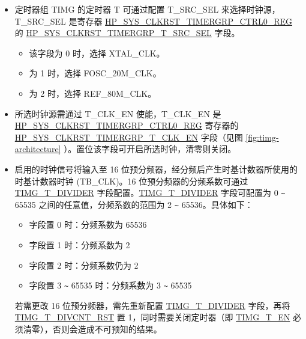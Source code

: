 \documentclass[main\_\_CN.tex]{subfiles}
\begin{document}
\begin{itemize}
    \item 定时器组 TIMG 的定时器 T 可通过配置 T\_SRC\_SEL 来选择时钟源，T\_SRC\_SEL 是寄存器 \hyperref[regdesc:HPSYSCLKRSTTIMERGRPNCTRL0REG]{HP\_SYS\_CLKRST\_TIMERGRP\_CTRL0\_REG} 的 \hyperref[fielddesc:HPSYSCLKRSTTIMERGRPNTXSRCSEL]{HP\_SYS\_CLKRST\_TIMERGRP\_T\_SRC\_SEL} 字段。
    \begin{itemize}
        \item 该字段为 0 时，选择 XTAL\_CLK。
        \item 为 1 时，选择 FOSC\_20M\_CLK。
        \item 为 2 时，选择 REF\_80M\_CLK。
    \end{itemize}

    \item 所选时钟源需通过 T\_CLK\_EN 使能，T\_CLK\_EN 是 \hyperref[regdesc:HPSYSCLKRSTTIMERGRPNCTRL0REG]{HP\_SYS\_CLKRST\_TIMERGRP\_CTRL0\_REG} 寄存器的 \hyperref[fielddesc:HPSYSCLKRSTTIMERGRPNTXCLKEN]{HP\_SYS\_CLKRST\_TIMERGRP\_T\_CLK\_EN} 字段（见图 \ref{fig:timg-architecture} \textit{}）。置位该字段可开启所选时钟，清零则关闭。
    \item 启用的时钟信号将输入至 16 位预分频器，经分频后产生时基计数器所使用的时基计数器时钟 (TB\_CLK)。16 位预分频器的分频系数可通过 \hyperref[fielddesc:TIMGTXDIVIDER]{TIMG\_T\_DIVIDER} 字段配置。\hyperref[fielddesc:TIMGTXDIVIDER]{TIMG\_T\_DIVIDER} 字段可配置为 0 \verb+~+ 65535 之间的任意值，分频系数的范围为 2 \verb+~+ 65536。具体如下：
    \begin{itemize}
        \item 字段置 0 时：分频系数为 65536
        \item 字段置 1 时：分频系数为 2
        \item 字段置 2 时：分频系数仍为 2
        \item 字段置 3 \verb+~+ 65535 时：分频系数为 3 \verb+~+ 65535
    \end{itemize}

    若需更改 16 位预分频器，需先重新配置 \hyperref[fielddesc:TIMGTXDIVIDER]{TIMG\_T\_DIVIDER} 字段，再将 \hyperref[fielddesc:TIMGTXDIVCNTRST]{TIMG\_T\_DIVCNT\_RST} 置 1，同时需要关闭定时器（即 \hyperref[fielddesc:TIMGTXEN]{TIMG\_T\_EN} 必须清零），否则会造成不可预知的结果。

\end{itemize}
\end{document}
